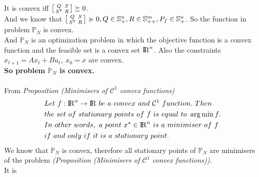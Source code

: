 \documentclass[a4paper,11pt,reqno]{amsart}
\newcommand{\R}{{\rm I\!R}}
\newcommand{\tran}{\intercal}
\DeclareMathOperator*{\argmin}{arg\,min}
\begin{document}
It is convex iff $\begin{bsmallmatrix}Q&S\\S^{\tran}&R\end{bsmallmatrix}\succeq 0$.
\\
And we know that $\begin{bsmallmatrix}Q&S\\S^{\tran}&R\end{bsmallmatrix}\succcurlyeq 0, Q\in \mathbb{S}^n_+, R\in \mathbb{S}^m_{++}, P_f\in \mathbb{S}^n_{+}$. So the function in problem $\mathbb{P}_N$ is convex. 
\\
And $\mathbb{P}_N$ is an optimization problem in which the objective function is a convex function and the feasible set is a convex set $\R^n$.
Also the constraints $x_{t+1}=Ax_t+Bu_t,\ x_0=x$ are convex.
\\
\textbf{So problem $\mathbb{P}_N$ is convex.}
\\ \\
From \textit{Proposition (Minimisers of $\mathcal{C}^1$ convex functions)}
\begin{align}
    &Let\ f : \R^n\rightarrow\R\ be\ a\ convex\ and\ \mathcal{C}^1\ function.\ Then
    \notag
    \\
    &the\ set\ of\ stationary\ points\ of\ f\ is\ equal\ to\ \argmin f.
    \notag
    \\
    &In\ other\ words,\ a\ point\ x^{\star}\in\R^n\ is\ a\ minimiser\ of\ f\ 
    \notag
    \\
    &if\ and\ only\ if\ it\ is\ a\ stationary\ point.
    \notag
\end{align}
We know that $\mathbb{P}_N$ is convex, therefore all stationary
points of $\mathbb{P}_N$ are minimisers of the problem \textit{(Proposition (Minimisers of $\mathcal{C}^1$ convex functions))}.
\\
It is 
\end{document}
